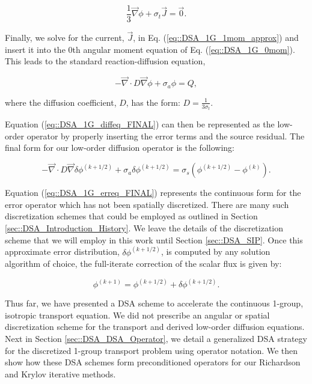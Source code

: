 \begin{equation}
\label{eq::DSA_1G_1mom_approx}
\frac{1}{3} \vec{\nabla} \phi+ \sigma_t \vec{J} = \vec{0} .
\end{equation}

\noindent Finally, we solve for the current, $\vec{J}$, in Eq. (\ref{eq::DSA_1G_1mom_approx}) and insert it into the 0th angular moment equation of Eq. (\ref{eq::DSA_1G_0mom}). This leads to the standard reaction-diffusion equation,

\begin{equation}
\label{eq::DSA_1G_diffeq_FINAL}
-\vec{\nabla} \cdot D \vec{\nabla} \phi + \sigma_a \phi =  Q ,
\end{equation}

\noindent where the diffusion coefficient, $D$, has the form: $D = \frac{1}{3 \sigma_t}$. 

Equation (\ref{eq::DSA_1G_diffeq_FINAL}) can then be represented as the low-order operator by properly inserting the error terms and the source residual. The final form for our low-order diffusion operator is the following:

\begin{equation}
\label{eq::DSA_1G_erreq_FINAL}
-\vec{\nabla} \cdot D \vec{\nabla} \delta \phi^{(k+1/2)} + \sigma_a \delta \phi^{(k+1/2)} = \sigma_s \left( \phi^{(k+1/2)} -  \phi^{(k)}\right)  .
\end{equation}

\noindent Equation (\ref{eq::DSA_1G_erreq_FINAL}) represents the continuous form for the error operator which has not been spatially discretized. There are many such discretization schemes that could be employed as outlined in Section \ref{sec::DSA_Introduction_History}. We leave the details of the discretization scheme that we will employ in this work until Section \ref{sec::DSA_SIP}. Once this approximate error distribution, $\delta \phi^{(k+1/2)}$, is computed by any solution algorithm of choice, the full-iterate correction of the scalar flux is given by:

\begin{equation}
\label{eq::DSA_1G_update}
 \phi^{(k+1)} =  \phi^{(k+1/2)} + \delta \phi^{(k+1/2)} .
\end{equation}

\noindent Thus far, we have presented a DSA scheme to accelerate the continuous 1-group, isotropic transport equation. We did not prescribe an angular or spatial discretization scheme for the transport and derived low-order diffusion equations. Next in Section \ref{sec::DSA_DSA_Operator}, we detail a generalized DSA strategy for the discretized 1-group transport problem using operator notation. We then show how these DSA schemes form preconditioned operators for our Richardson and Krylov iterative methods.

